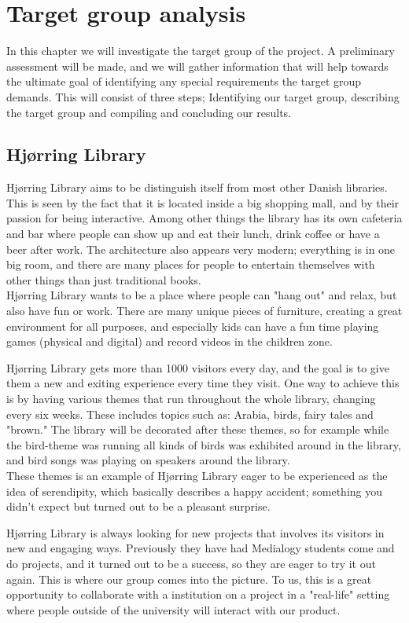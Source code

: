 \chapter{Target group analysis}
In this chapter we will investigate the target group of the project. A preliminary assessment will be made, and we will gather information that will help towards the ultimate goal of identifying any special requirements the target group demands. This will consist of three steps; Identifying our target group, describing the target group and compiling and concluding our results.

\section{Hj{\o}rring Library}
Hj{\o}rring Library aims to be distinguish itself from most other Danish libraries. This is seen by the fact that it is located inside a big shopping mall, and by their passion for being interactive. Among other things the library has its own cafeteria and bar where people can show up and eat their lunch, drink coffee or have a beer after work. The architecture also appears very modern; everything is in one big room, and there are many places for people to entertain themselves with other things than just traditional books. \\ Hj{\o}rring Library wants to be a place where people can "hang out" and relax, but also have fun or work. There are many unique pieces of furniture, creating a great environment for all purposes, and especially kids can have a fun time playing games (physical and digital) and record videos in the children zone.

Hj{\o}rring Library gets more than 1000 visitors every day, and the goal is to give them a new and exiting experience every time they visit. One way to achieve this is by having various themes that run throughout the whole library, changing every six weeks. These includes topics such as: Arabia, birds, fairy tales and "brown." The library will be decorated after these themes, so for example while the bird-theme was running all kinds of birds was exhibited around in the library, and bird songs was playing on speakers around the library.\\
These themes is an example of Hj{\o}rring Library eager to be experienced as the idea of serendipity, which basically describes a happy accident; something you didn't expect but turned out to be a pleasant surprise.

Hj{\o}rring Library is always looking for new projects that involves its visitors in new and engaging ways. Previously they have had Medialogy students come and do projects, and it turned out to be a success, so they are eager to try it out again. This is where our group comes into the picture. To us, this is a great opportunity to collaborate with a institution on a project in a "real-life" setting where people outside of the university will interact with our product.

